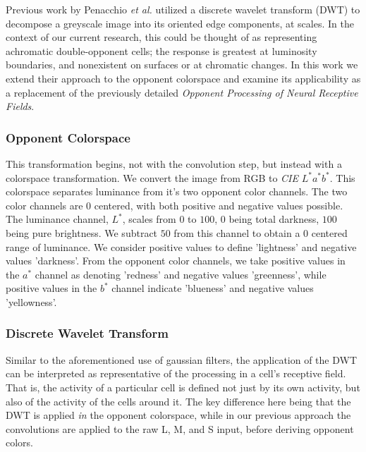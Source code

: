 \documentclass[journal,onecolumn]{IEEEtran}
\begin{document}
Previous work by Penacchio \textit{et al.} \cite{otazu:plosive} utilized a discrete wavelet transform (DWT) to decompose a greyscale image into its oriented edge components, at scales. In the context of our current research, this could be thought of as representing achromatic double-opponent cells; the response is greatest at luminosity boundaries, and nonexistent on surfaces or at chromatic changes. In this work we extend their approach to the opponent colorspace and examine its applicability as a replacement of the previously detailed \textit{Opponent Processing of Neural Receptive Fields}.

\subsubsection*{Opponent Colorspace}
This transformation begins, not with the convolution step, but instead with a colorspace transformation. We convert the image from RGB to \textit{CIE} $L^*a^*b^*$. This colorspace separates luminance from it's two opponent color channels. The two color channels are $0$ centered, with both positive and negative values possible. The luminance channel, $L^*$, scales from $0$ to $100$, $0$ being total darkness, $100$ being pure brightness. We subtract $50$ from this channel to obtain a $0$ centered range of luminance. We consider positive values to define 'lightness' and negative values 'darkness'. From the opponent color channels, we take positive values in the $a^*$ channel as denoting 'redness' and negative values 'greenness', while positive values in the $b^*$ channel indicate 'blueness' and negative values 'yellowness'.

\subsubsection*{Discrete Wavelet Transform}
Similar to the aforementioned use of gaussian filters, the application of the DWT can be interpreted as representative of the processing in a cell's receptive field. That is, the activity of a particular cell is defined not just by its own activity, but also of the activity of the cells around it. The key difference here being that the DWT is applied \textit{in} the opponent colorspace, while in our previous approach the convolutions are applied to the raw L, M, and S input, before deriving opponent colors.
\end{document}
